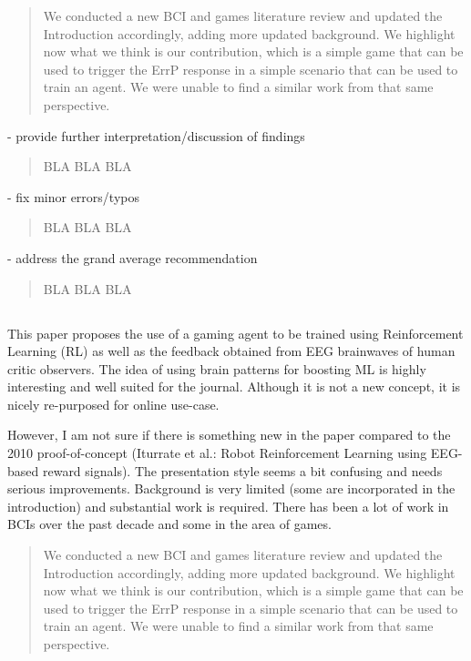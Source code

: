 \documentclass[journal,onecolumn,12pt]{IEEEtran}
\begin{document}
\begin{quotation}
{\color{blue}
We conducted a new BCI and games literature review and updated the Introduction accordingly, adding more updated background.  We highlight now what we think is our contribution, which is a simple game that can be used to trigger the ErrP response in a simple scenario that can be used to train an agent.  We were unable to find a similar work from that same perspective.  
}
\end{quotation}


- provide further interpretation/discussion of findings

\begin{quotation}
{\color{blue}
BLA BLA BLA
}
\end{quotation}

- fix minor errors/typos

\begin{quotation}
{\color{blue}
BLA BLA BLA
}
\end{quotation}

- address the grand average recommendation

\begin{quotation}
{\color{blue}
BLA BLA BLA
}
\end{quotation}

\subsection*{}

This paper proposes the use of a gaming agent to be trained using Reinforcement Learning (RL) as well as the feedback obtained from EEG brainwaves of human critic observers. The idea of using brain patterns for boosting ML is highly interesting and well suited for the journal. Although it is not a new concept, it is nicely re-purposed for online use-case.

However, I am not sure if there is something new in the paper compared to the 2010 proof-of-concept (Iturrate et al.: Robot Reinforcement Learning using EEG-based reward signals). The presentation style seems a bit confusing and needs serious improvements. Background is very limited (some are incorporated in the introduction) and substantial work is required. There has been a lot of work in BCIs over the past decade and some in the area of games.

\begin{quotation}
{\color{blue}
We conducted a new BCI and games literature review and updated the Introduction accordingly, adding more updated background.  We highlight now what we think is our contribution, which is a simple game that can be used to trigger the ErrP response in a simple scenario that can be used to train an agent.  We were unable to find a similar work from that same perspective.  
}
\end{quotation}
\end{document}
